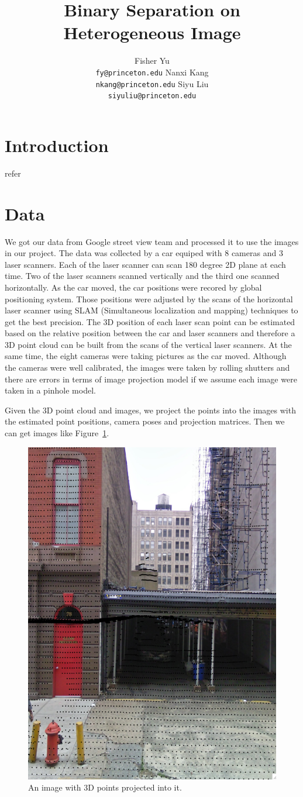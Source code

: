 \documentclass{article} %
\title{Binary Separation on Heterogeneous Image}
\author{
Fisher Yu \\
\texttt{fy@princeton.edu}
\And
Nanxi Kang \\
\texttt{nkang@princeton.edu} 
\And
Siyu Liu\\
\texttt{siyuliu@princeton.edu}
}
\begin{document}
\maketitle

\section{Introduction}
refer~\citet{Besag74}
\section{Data}
We got our data from Google street view team and processed it to use
the images in our project. The data was collected by a car equiped
with 8 cameras and 3 laser scanners. Each of the laser scanner can scan 180 degree 2D
plane at each time. Two of the laser scanners scanned vertically and
the third one scanned horizontally. As the car moved, the car
positions were recored by global positioning system. Those positions
were adjusted by the scans of the horizontal laser scanner using SLAM
(Simultaneous localization and mapping) techniques to get the best
precision. The 3D position of each laser scan point can be
estimated based on the relative position between the car and laser
scanners and therefore a 3D point cloud can be built from the scans of
the vertical laser scanners. At the same time, the eight
cameras were taking pictures as the car moved. Although the cameras
were well calibrated, the images were taken by rolling shutters and
there are errors in terms of image projection model if we assume each
image were taken in a pinhole model.

Given the 3D point cloud and images, we project the points into the
images with the estimated point positions, camera poses and projection
matrices. Then we can get images like Figure~\ref{fig-data_image}.

\begin{figure}[h]
\begin{center}
\includegraphics[height=0.5\linewidth]{./fig/image_sample.png}
\end{center}
\caption{An image with 3D points projected into it.}
\label{fig-data_image}
\end{figure}
\end{document}
